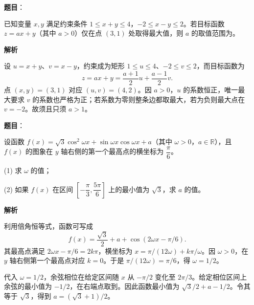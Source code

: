\begin{answer}

\textbf{题目}：

已知变量 \(x,y\) 满足约束条件 \(1\leq x+y\leq4\)，\(-2\leq x-y\leq2\)。若目标函数 \(z=ax+y\)（其中 \(a>0\)）仅在点 \((3,1)\) 处取得最大值，则 \(a\) 的取值范围为\gkblank{}。

\textbf{解析}

设 \(u=x+y\)、\(v=x-y\)，约束成为矩形 \(1\le u\le4\)、\(-2\le v\le2\)，而目标函数为
\nopagebreak[4]
\[
z=ax+y=\frac{a+1}{2}u+\frac{a-1}{2}v.
\]
点 \((x,y)=(3,1)\) 对应 \((u,v)=(4,2)\)。因 \(a>0\)，\(u\) 的系数恒正，唯一最大要求 \(v\) 的系数也严格为正；若系数为零则整条边都取最大，若为负则最大点在 \(v=-2\)。故须且只须 \(a>1\)。


\end{answer}
\begin{answer}

\textbf{题目}：

设函数 \(f(x)=\sqrt3\cos^2\omega x+\sin\omega x\cos\omega x+a\)（其中 \(\omega>0\)，\(a\in\mathbb R\)），且 \(f(x)\) 的图象在 \(y\) 轴右侧的第一个最高点的横坐标为 \(\dfrac\pi6\)。

(1) 求 \(\omega\) 的值；

(2) 如果 \(f(x)\) 在区间 \(\left[-\dfrac\pi3,\dfrac{5\pi}6\right]\) 上的最小值为 \(\sqrt3\)，求 \(a\) 的值。

\textbf{解析}


利用倍角恒等式，函数可写成
\nopagebreak[4]
\[
f(x)=\frac{\sqrt3}{2}+a+\cos(2\omega x-\pi/6).
\]
其最高点满足 \(2\omega x-\pi/6=2k\pi\)，横坐标为 \(x=\pi/(12\omega)+k\pi/\omega\)。因 \(\omega>0\)，在 \(y\) 轴右侧第一个最高点对应 \(k=0\)。于是 \(\pi/(12\omega)=\pi/6\)，得 \(\omega=1/2\)。


代入 \(\omega=1/2\)，余弦相位在给定区间随 \(x\) 从 \(-\pi/2\) 变化至 \(2\pi/3\)。给定相位区间上余弦的最小值为 \(-1/2\)，在右端点取到。因此函数最小值为 \(\sqrt3/2+a-1/2\)。令其等于 \(\sqrt3\)，得到 \(a=(\sqrt3+1)/2\)。



\end{answer}
